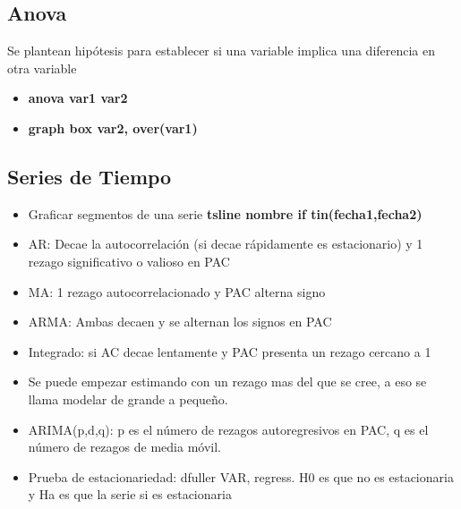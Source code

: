 \subsection{Anova}

Se plantean hipótesis para establecer si una variable implica una diferencia en otra variable
\begin{itemize}
	\item \textbf{anova var1 var2}
	\item \textbf{graph box var2, over(var1)}
\end{itemize}

\subsection{Series de Tiempo}
\begin{itemize}
	\item Graficar segmentos de una serie \textbf{tsline nombre if tin(fecha1,fecha2)}
\end{itemize}

\begin{itemize}
	\item AR: Decae la autocorrelación (si decae rápidamente es estacionario) y 1 rezago significativo o valioso en PAC
	\item MA: 1 rezago autocorrelacionado y PAC alterna signo
	\item ARMA: Ambas decaen y se alternan los signos en PAC
	\item Integrado: si AC decae lentamente y PAC presenta un rezago cercano a 1
	\item Se puede empezar estimando con un rezago mas del que se cree, a eso se llama modelar de grande a pequeño.
	\item ARIMA(p,d,q): p es el número de rezagos autoregresivos en PAC, q es el número de rezagos de media móvil.
	\item Prueba de estacionariedad: dfuller VAR, regress.
	H0 es que no es estacionaria y Ha es que la serie si es estacionaria
\end{itemize}